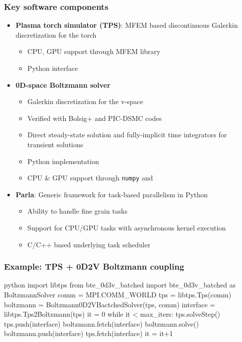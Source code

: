 \documentclass[mathserif, aspectratio=169]{beamer}
\begin{document}
\begin{frame}
	\frametitle{Key software components}
	\begin{itemize}
		\item \textbf{Plasma torch simulator (TPS)}: MFEM based discontinuous Galerkin discretization for the torch
		\begin{itemize}
			\item CPU, GPU support through MFEM library
			\item Python interface
		\end{itemize}
		\item \textbf{0D-space Boltzmann solver}
		\begin{itemize}
			\item Galerkin discretization for the v-space
			\item Verified with Bolsig+ and PIC-DSMC codes
			\item Direct steady-state solution and fully-implicit time integrators for transient solutions
			\item Python implementation
			\item CPU \& GPU support through \texttt{numpy} and 
		\end{itemize}
		\item \textbf{Parla}: Generic framework for task-based parallelism in Python
			\begin{itemize}
			\item Ability to handle fine grain tasks
			\item Support for CPU/GPU tasks with asynchronous kernel execution
			\item C/C++ based underlying task scheduler
			\end{itemize}
	\end{itemize}
\end{frame}





\begin{frame}[fragile]
\frametitle{Example: TPS + 0D2V Boltzmann coupling}
\begin{mintedbox}{python}%
import libtps
from   bte_0d3v_batched import bte_0d3v_batched as BoltzmannSolver
comm = MPI.COMM_WORLD
tps = libtps.Tps(comm)
boltzmann = Boltzmann0D2VBactchedSolver(tps, comm)
interface = libtps.Tps2Boltzmann(tps)
it = 0
while it < max_iters:
    tps.solveStep()
    tps.push(interface)
    boltzmann.fetch(interface)
    boltzmann.solve()
    boltzmann.push(interface)
    tps.fetch(interface)
    it = it+1
\end{mintedbox}
\end{frame}
\end{document}
